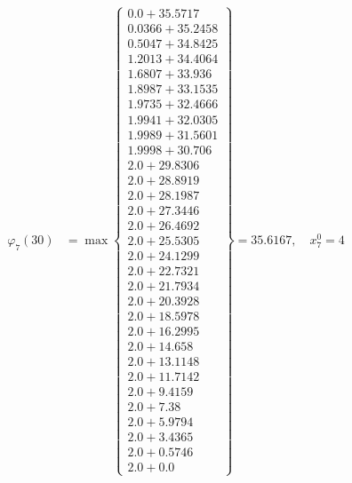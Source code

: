 \documentclass{article}
\begin{document}
\begin{align*}
\varphi_{7}(30) &= \max \left\{ \begin{array}{c}
0.0 + 35.5717 \\
 0.0366 + 35.2458 \\
 0.5047 + 34.8425 \\
 1.2013 + 34.4064 \\
 1.6807 + 33.936 \\
 1.8987 + 33.1535 \\
 1.9735 + 32.4666 \\
 1.9941 + 32.0305 \\
 1.9989 + 31.5601 \\
 1.9998 + 30.706 \\
 2.0 + 29.8306 \\
 2.0 + 28.8919 \\
 2.0 + 28.1987 \\
 2.0 + 27.3446 \\
 2.0 + 26.4692 \\
 2.0 + 25.5305 \\
 2.0 + 24.1299 \\
 2.0 + 22.7321 \\
 2.0 + 21.7934 \\
 2.0 + 20.3928 \\
 2.0 + 18.5978 \\
 2.0 + 16.2995 \\
 2.0 + 14.658 \\
 2.0 + 13.1148 \\
 2.0 + 11.7142 \\
 2.0 + 9.4159 \\
 2.0 + 7.38 \\
 2.0 + 5.9794 \\
 2.0 + 3.4365 \\
 2.0 + 0.5746 \\
 2.0 + 0.0
\end{array} \right\}=35.6167, \quad x_{7}^0=4\\
  

\end{align*}
\end{document}
